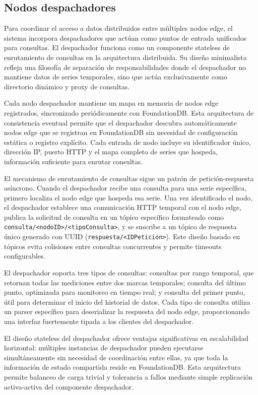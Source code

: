 \subsection{Nodos despachadores}

Para coordinar el acceso a datos distribuidos entre múltiples nodos edge, el sistema incorpora despachadores que actúan como puntos de entrada unificados para consultas. El despachador funciona como un componente stateless de enrutamiento de consultas en la arquitectura distribuida. Su diseño minimalista refleja una filosofía de separación de responsabilidades donde el despachador no mantiene datos de series temporales, sino que actúa exclusivamente como directorio dinámico y proxy de consultas.

Cada nodo despachador mantiene un mapa en memoria de nodos edge registrados, sincronizado periódicamente con FoundationDB. Esta arquitectura de consistencia eventual permite que el despachador descubra automáticamente nodos edge que se registran en FoundationDB sin necesidad de configuración estática o registro explícito. Cada entrada de nodo incluye su identificador único, dirección IP, puerto HTTP y el mapa completo de series que hospeda, información suficiente para enrutar consultas.

El mecanismo de enrutamiento de consultas sigue un patrón de petición-respuesta asíncrono. Cuando el despachador recibe una consulta para una serie específica, primero localiza el nodo edge que hospeda esa serie. Una vez identificado el nodo, el despachador establece una comunicación HTTP temporal con el nodo edge, publica la solicitud de consulta en un tópico específico formateado como \texttt{consulta/<nodoID>/<tipoConsulta>}, y se suscribe a un tópico de respuesta único generado con UUID (\texttt{respuesta/<IDPeticion>}). Este diseño basado en tópicos evita colisiones entre consultas concurrentes y permite timeouts configurables.

El despachador soporta tres tipos de consultas: consultas por rango temporal, que retornan todas las mediciones entre dos marcas temporales; consulta del último punto, optimizada para monitoreo en tiempo real; y consulta del primer punto, útil para determinar el inicio del historial de datos. Cada tipo de consulta utiliza un parser específico para deserializar la respuesta del nodo edge, proporcionando una interfaz fuertemente tipada a los clientes del despachador.

El diseño stateless del despachador ofrece ventajas significativas en escalabilidad horizontal: múltiples instancias de despachador pueden ejecutarse simultáneamente sin necesidad de coordinación entre ellas, ya que toda la información de estado compartida reside en FoundationDB. Esta arquitectura permite balanceo de carga trivial y tolerancia a fallos mediante simple replicación activa-activa del componente despachador.

